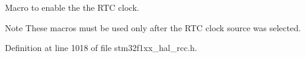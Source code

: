 Macro to enable the the R\+TC clock. 

\begin{DoxyNote}{Note}
These macros must be used only after the R\+TC clock source was selected. 
\end{DoxyNote}


Definition at line 1018 of file stm32f1xx\+\_\+hal\+\_\+rcc.\+h.

